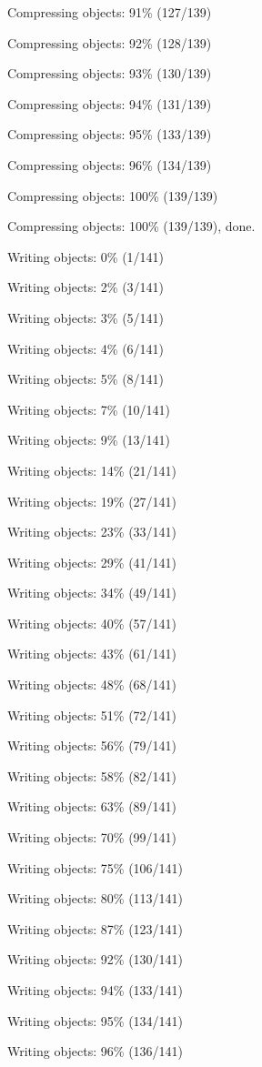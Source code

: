 \documentclass[11pt,a4paper]{article}
\begin{document}
{Compressing objects:  91\% (127/139)

Compressing objects:  92\% (128/139)

Compressing objects:  93\% (130/139)

Compressing objects:  94\% (131/139)

Compressing objects:  95\% (133/139)

Compressing objects:  96\% (134/139)

Compressing objects: 100\% (139/139)

Compressing objects: 100\% (139/139), done.

Writing objects:   0\% (1/141)

Writing objects:   2\% (3/141)

Writing objects:   3\% (5/141)

Writing objects:   4\% (6/141)

Writing objects:   5\% (8/141)

Writing objects:   7\% (10/141)

Writing objects:   9\% (13/141)

Writing objects:  14\% (21/141)

Writing objects:  19\% (27/141)

Writing objects:  23\% (33/141)

Writing objects:  29\% (41/141)

Writing objects:  34\% (49/141)

Writing objects:  40\% (57/141)

Writing objects:  43\% (61/141)

Writing objects:  48\% (68/141)

Writing objects:  51\% (72/141)

Writing objects:  56\% (79/141)

Writing objects:  58\% (82/141)

Writing objects:  63\% (89/141)

Writing objects:  70\% (99/141)

Writing objects:  75\% (106/141)

Writing objects:  80\% (113/141)

Writing objects:  87\% (123/141)

Writing objects:  92\% (130/141)

Writing objects:  94\% (133/141)

Writing objects:  95\% (134/141)

Writing objects:  96\% (136/141)

}
\end{document}
